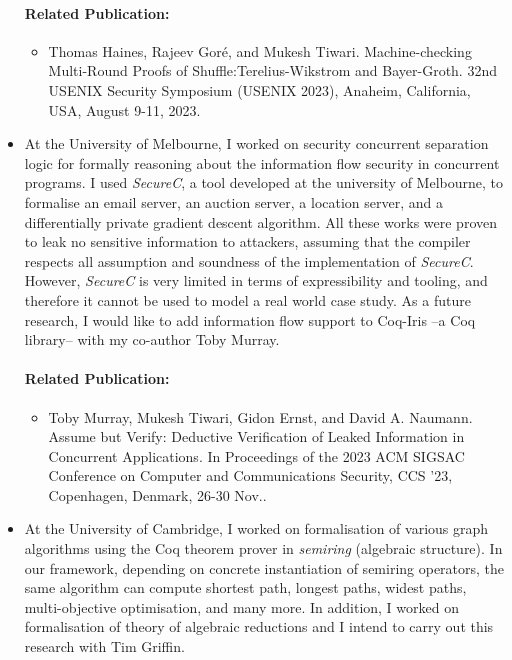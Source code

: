 \documentclass[a4paper]{article}
\begin{document}
\begin{itemize}
\paragraph{Related Publication:} 
\begin{itemize}
    \item Thomas Haines, Rajeev Gor{\'e}, and Mukesh Tiwari.
    Machine-checking Multi-Round Proofs of Shuffle:Terelius-Wikstrom and Bayer-Groth. 
    32nd USENIX Security Symposium (USENIX 2023), Anaheim, California, USA, August 9-11, 2023.

\end{itemize}


\item At the University of Melbourne, I worked on 
security concurrent separation logic for formally reasoning about the information 
flow security in concurrent programs. I used \textit{SecureC}, a tool developed at the university of 
Melbourne, to formalise an email server, an auction server, a location server, and 
a differentially private gradient descent algorithm. 
All these works were proven to leak no sensitive 
information to attackers, assuming that the compiler respects all 
assumption and soundness of the implementation of \textit{SecureC}. However, 
\textit{SecureC} is very limited in terms of expressibility and tooling, 
and therefore it cannot be used to model a real world case study. As a future research, 
I would like to add information flow support to Coq-Iris --a Coq library-- 
with my co-author Toby Murray.


\paragraph{Related Publication:} 
\begin{itemize}
\item { Toby Murray, Mukesh Tiwari, Gidon Ernst, and David A. Naumann. 
Assume but Verify: Deductive Verification of Leaked Information in Concurrent Applications. 
In Proceedings of the 2023 ACM SIGSAC Conference on 
Computer and Communications Security, CCS '23, Copenhagen, Denmark, 26-30 Nov.}.
\end{itemize}


\item At the University of Cambridge, I worked on formalisation of 
various graph algorithms using the Coq theorem prover in \emph{semiring} 
(algebraic structure). In our framework, depending on concrete 
instantiation of semiring operators,
the same algorithm can compute shortest path, longest paths, widest paths, 
multi-objective optimisation, and many more. In addition,
I worked on formalisation of theory of algebraic reductions and  
I intend to carry out this research with Tim Griffin. 



\end{itemize}
\end{document}
